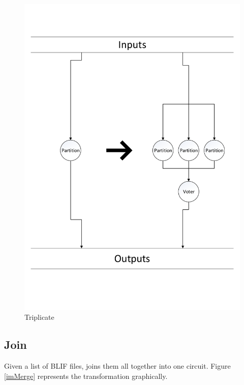 \documentclass[12pt,final,oneside,a4paper]{dwThesis} %
\begin{document}
   \begin{figure}

      \begin{center}

         \includegraphics[width=\linewidth]{images/Triplicate.pdf}
         \caption{Triplicate} \label{imTriplicate} 
      \end{center}

   \end{figure}

   \newpage 
   \subsection{Join}
   \label{algJoin} Given a list of \gls{BLIF} files,
   joins them all together into one circuit.
   Figure \ref{imMerge} represents the transformation graphically.
   
\end{document}
